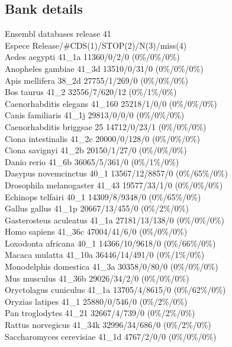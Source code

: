 \documentclass{article}
\begin{document}
\begin{Schunk}
\subsection{Bank details}
Ensembl databases release 41\\
Espece                                  Release/\#CDS(1)/STOP(2)/N(3)/miss(4)\\
Aedes aegypti                           41\_1a 11360/0/2/0 (0\%/0\%/0\%)\\
Anopheles gambiae                       41\_3d 13510/0/31/0 (0\%/0\%/0\%)\\
Apis mellifera                          38\_2d 27755/1/269/0 (0\%/0\%/0\%)\\
Bos taurus                              41\_2 32556/7/620/12 (0\%/1\%/0\%)\\
Caenorhabditis elegans                  41\_160 25218/1/0/0 (0\%/0\%/0\%)\\
Canis familiaris                        41\_1j 29813/0/0/0 (0\%/0\%/0\%)\\
Caenorhabditis briggsae                 25 14712/0/23/1 (0\%/0\%/0\%)\\
Ciona intestinalis                      41\_2c 20000/0/128/0 (0\%/0\%/0\%)\\
Ciona savignyi                          41\_2b 20150/1/27/0 (0\%/0\%/0\%)\\
Danio rerio                             41\_6b 36065/5/361/0 (0\%/1\%/0\%)\\
Dasypus novemcinctus                    40\_1 13567/12/8857/0 (0\%/65\%/0\%)\\
Drosophila melanogaster                 41\_43 19577/33/1/0 (0\%/0\%/0\%)\\
Echinops telfairi                       40\_1 14309/8/9348/0 (0\%/65\%/0\%)\\
Gallus gallus                           41\_1p 20667/13/455/0 (0\%/2\%/0\%)\\
Gasterosteus aculeatus                  41\_1a 27181/13/138/0 (0\%/0\%/0\%)\\
Homo sapiens                            41\_36c 47004/41/6/0 (0\%/0\%/0\%)\\
Loxodonta africana                      40\_1 14366/10/9618/0 (0\%/66\%/0\%)\\
Macaca mulatta                          41\_10a 36446/14/491/0 (0\%/1\%/0\%)\\
Monodelphis domestica                   41\_3a 30358/0/80/0 (0\%/0\%/0\%)\\
Mus musculus                            41\_36b 29026/34/2/0 (0\%/0\%/0\%)\\
Oryctolagus cuniculus                   41\_1a 13705/4/8615/0 (0\%/62\%/0\%)\\
Oryzias latipes                         41\_1 25880/0/546/0 (0\%/2\%/0\%)\\
Pan troglodytes                         41\_21 32667/4/739/0 (0\%/2\%/0\%)\\
Rattus norvegicus                       41\_34k 32996/34/686/0 (0\%/2\%/0\%)\\
Saccharomyces cerevisiae                41\_1d 4767/2/0/0 (0\%/0\%/0\%)


\end{Schunk}
\end{document}
